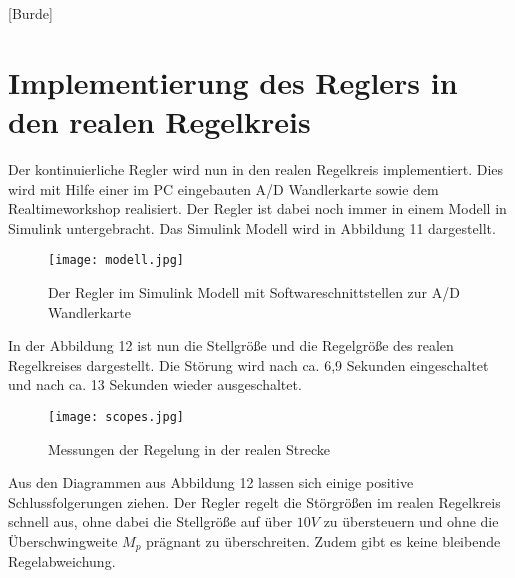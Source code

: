 
\newpage

[Burde]
\section{Implementierung des Reglers in den realen Regelkreis}

Der kontinuierliche Regler wird nun in den realen Regelkreis implementiert. Dies wird mit Hilfe einer im PC eingebauten A/D Wandlerkarte sowie dem Realtimeworkshop realisiert. Der Regler ist dabei noch immer in einem Modell in Simulink untergebracht. Das Simulink Modell wird in Abbildung 11 dargestellt.

\begin{figure}[h]
	\begin{center}
		\texttt{[image: modell.jpg]}
		\caption{Der Regler im Simulink Modell mit Softwareschnittstellen zur A/D Wandlerkarte}
       \label{final_modell}
	\end{center} 
\end{figure}

\newpage

In der Abbildung 12 ist nun die Stellgröße und die Regelgröße des realen Regelkreises dargestellt. Die Störung wird nach ca. 6,9 Sekunden eingeschaltet und nach ca. 13 Sekunden wieder ausgeschaltet.

\begin{figure}[h]
	\begin{center}
		\texttt{[image: scopes.jpg]}
		\caption{Messungen der Regelung in der realen Strecke}
       \label{scopes_real}
	\end{center} 
\end{figure}

Aus den Diagrammen aus Abbildung 12 lassen sich einige positive Schlussfolgerungen ziehen. Der Regler regelt die Störgrößen im realen Regelkreis schnell aus, ohne dabei die Stellgröße auf über $10V$ zu übersteuern und ohne die Überschwingweite $M_{p}$ prägnant zu überschreiten. Zudem gibt es keine bleibende Regelabweichung.